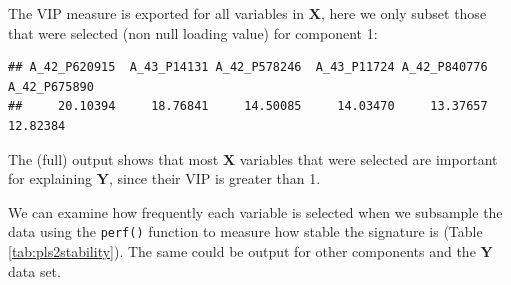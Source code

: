 \documentclass[]{book}
\newenvironment{Shaded}{\begin{snugshade}}{\end{snugshade}}
\newcommand{\KeywordTok}[1]{\textcolor[rgb]{0.13,0.29,0.53}{\textbf{#1}}}
\newcommand{\DataTypeTok}[1]{\textcolor[rgb]{0.13,0.29,0.53}{#1}}
\newcommand{\DecValTok}[1]{\textcolor[rgb]{0.00,0.00,0.81}{#1}}
\newcommand{\StringTok}[1]{\textcolor[rgb]{0.31,0.60,0.02}{#1}}
\newcommand{\CommentTok}[1]{\textcolor[rgb]{0.56,0.35,0.01}{\textit{#1}}}
\newcommand{\OperatorTok}[1]{\textcolor[rgb]{0.81,0.36,0.00}{\textbf{#1}}}
\newcommand{\NormalTok}[1]{#1}
\begin{document}
The VIP measure is exported for all variables in \(\boldsymbol X\), here
we only subset those that were selected (non null loading value) for
component 1:

\begin{Shaded}
\end{Shaded}

\begin{verbatim}
## A_42_P620915  A_43_P14131 A_42_P578246  A_43_P11724 A_42_P840776 A_42_P675890 
##     20.10394     18.76841     14.50085     14.03470     13.37657     12.82384
\end{verbatim}

The (full) output shows that most \(\boldsymbol X\) variables that were
selected are important for explaining \(\boldsymbol Y\), since their VIP
is greater than 1.

We can examine how frequently each variable is selected when we
subsample the data using the \texttt{perf()} function to measure how
stable the signature is (Table \ref{tab:pls2stability}). The same could
be output for other components and the \(\boldsymbol Y\) data set.

\begin{Shaded}
\end{Shaded}
\end{document}
